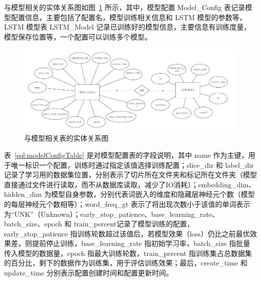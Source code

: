 与模型相关的实体关系图如图~\ref{er:model} 所示，其中，模型配置 Model\_Config 表记录模型配置信息，主要包括了配置名，模型训练相关信息和 LSTM 模型的参数等，LSTM 模型表 LSTM\_Model 记录已训练好的模型信息，主要信息有训练度量，模型保存位置等，一个配置可以训练多个模型。

\begin{figure}[!htbp]
	\centering
	\includegraphics[width=1\linewidth]{FIGs/chapter3/model_er.pdf}
    \vspace{-0.5cm}
	\caption{与模型相关表的实体关系图}\label{er:model}
    \vspace{-0.5cm}
\end{figure}

 表~\ref{sql:modelConfigTable} 是对模型配置表的字段说明，其中 name 作为主键，用于唯一标识一个配置，训练时通过指定该值选择训练配置；slice\_dir 和 label\_dir 记录了学习用的数据集位置，分别表示了切片所在文件夹和标记所在文件夹（模型直接通过文件进行读取，而不从数据库读取，减少了IO消耗）；embedding\_dim、hidden\_dim 为模型自身参数，分别代表词嵌入的维度和隐藏层神经元个数（模型的每层神经元个数相等）；word\_freq\_gt 表示了将出现次数小于该值的单词表示为“UNK”（Unknown）；early\_stop\_patience、base\_learning\_rate、batch\_size、epoch 和 train\_percent记录了模型训练的配置，early\_stop\_patience 指训练轮数超过该值后，若模型效果（loss）仍比之前最优效果差，则提前停止训练，base\_learning\_rate 指初始学习率，batch\_size 指批量传入模型的数据量，epoch 指最大训练轮数，train\_percent 指训练集占总数据集的百分比，剩下的数据作为训练集，用于评估训练效果；最后，create\_time 和 update\_time 分别表示配置创建时间和配置更新时间。

